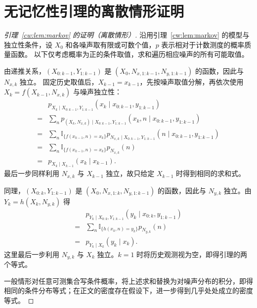 \section{无记忆性引理的离散情形证明}\label{cw:app:markov-proof}

\begin{proof}[引理~\ref{cw:lem:markov} 的证明（离散情形）]
沿用引理~\ref{cw:lem:markov} 的模型与独立性条件，设 $X_0$ 和各噪声取有限或可数个值，$p$ 表示相对于计数测度的概率质量函数。
以下仅考虑概率为正的条件取值，求和遍历相应噪声的所有可能取值。

由递推关系，$(X_{0:k-1},Y_{1:k-1})$ 是 $(X_0,N_{x,1:k-1},N_{y,1:k-1})$ 的函数，因此与 $N_{x,k}$ 独立。
固定历史取值后，$X_{k-1}=x_{k-1}$，先按噪声取值分解，再依次使用 $X_k=f(X_{k-1},N_{x,k})$ 与噪声独立性：
\begin{equation*}
\begin{aligned}
&p_{X_k\mid X_{0:k-1},Y_{1:k-1}}(x_k\mid x_{0:k-1},y_{1:k-1})\\
= &\sum_n p_{(X_k,N_{x,k})\mid X_{0:k-1},Y_{1:k-1}}(x_k,n\mid x_{0:k-1},y_{1:k-1})\\
= &\sum_n\mathbb I_{\{f(x_{k-1},n)=x_k\}}p_{N_{x,k}\mid X_{0:k-1},Y_{1:k-1}}(n\mid x_{0:k-1},y_{1:k-1})\\
= &\sum_n\mathbb I_{\{f(x_{k-1},n)=x_k\}}p_{N_{x,k}}(n)\\
= &p_{X_k\mid X_{k-1}}(x_k\mid x_{k-1}).
\end{aligned}
\end{equation*}
最后一步同样利用 $N_{x,k}$ 与 $X_{k-1}$ 独立，故只给定 $X_{k-1}$ 时得到相同的求和式。

同理，$(X_{0:k},Y_{1:k-1})$ 是 $(X_0,N_{x,1:k},N_{y,1:k-1})$ 的函数，因此与 $N_{y,k}$ 独立。由 $Y_k=h(X_k,N_{y,k})$ 得
\begin{equation*}
\begin{aligned}
&p_{Y_k\mid X_{0:k},Y_{1:k-1}}(y_k\mid x_{0:k},y_{1:k-1})\\
= &\sum_n\mathbb I_{\{h(x_k,n)=y_k\}}p_{N_{y,k}}(n)\\
= &p_{Y_k\mid X_k}(y_k\mid x_k).
\end{aligned}
\end{equation*}
这里最后一步利用 $N_{y,k}$ 与 $X_k$ 独立。$k=1$ 时将历史观测视为空，即得引理的两个等式。

一般情形对任意可测集合写条件概率，将上述求和替换为对噪声分布的积分，即得相同的条件分布等式；在正文的密度存在假设下，进一步得到几乎处处成立的密度等式。
\end{proof}
